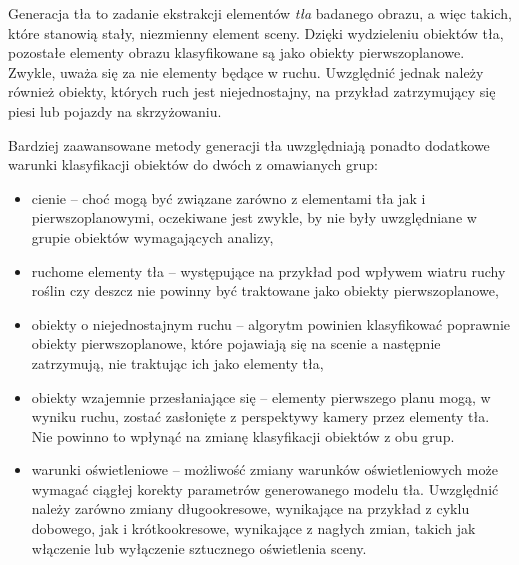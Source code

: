 Generacja tła to zadanie ekstrakcji elementów \textit{tła} badanego obrazu, a więc takich, które stanowią stały, niezmienny element sceny. 
Dzięki wydzieleniu obiektów tła, pozostałe elementy obrazu klasyfikowane są jako obiekty pierwszoplanowe. 
Zwykle, uważa się za nie elementy będące w ruchu. Uwzględnić jednak należy również obiekty, których ruch jest niejednostajny, na przykład zatrzymujący się piesi lub pojazdy na skrzyżowaniu. %

Bardziej zaawansowane metody generacji tła uwzględniają ponadto dodatkowe warunki klasyfikacji obiektów do dwóch z omawianych grup:
\begin{itemize}
	\item cienie -- choć mogą być związane zarówno z elementami tła jak i pierwszoplanowymi, oczekiwane jest zwykle, by nie były uwzględniane w grupie obiektów wymagających analizy,
	\item ruchome elementy tła -- występujące na przykład pod wpływem wiatru ruchy roślin czy deszcz nie powinny być traktowane jako obiekty pierwszoplanowe,
	\item obiekty o niejednostajnym ruchu -- algorytm powinien klasyfikować poprawnie obiekty pierwszoplanowe, które pojawiają się na scenie a następnie zatrzymują, nie traktując ich jako elementy tła, %
	\item obiekty wzajemnie przesłaniające się -- elementy pierwszego planu mogą, w wyniku ruchu, zostać zasłonięte z perspektywy kamery przez elementy tła. Nie powinno to wpłynąć na zmianę klasyfikacji obiektów z obu grup.
	\item warunki oświetleniowe -- możliwość zmiany warunków oświetleniowych może wymagać ciągłej korekty parametrów generowanego modelu tła. Uwzględnić należy zarówno zmiany długookresowe, wynikające na przykład z cyklu dobowego, jak i krótkookresowe, wynikające z nagłych zmian, takich jak włączenie lub wyłączenie sztucznego oświetlenia sceny.
\end{itemize}

